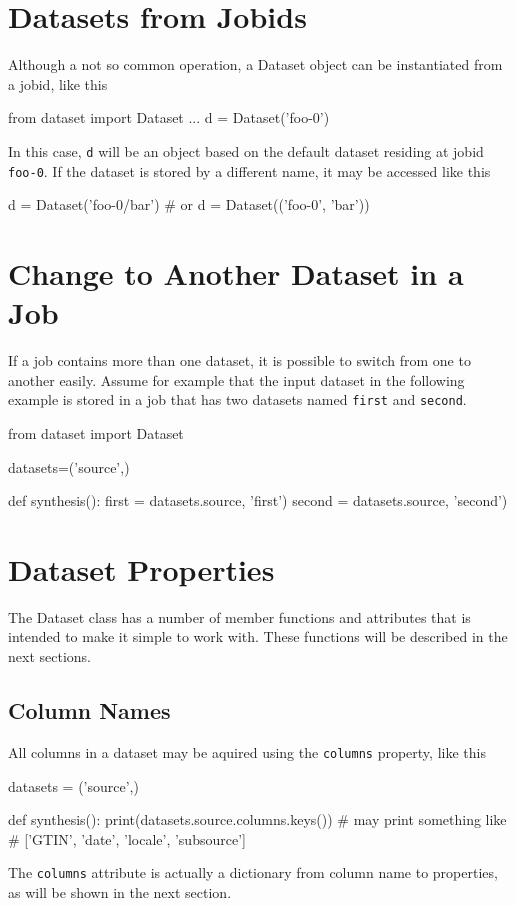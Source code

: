\section{Datasets from Jobids}
Although a not so common operation, a Dataset object can be
instantiated from a jobid, like this
\begin{python}
from dataset import Dataset
...
d = Dataset('foo-0')
\end{python}
In this case, \texttt{d} will be an object based on the default
dataset residing at jobid \texttt{foo-0}.  If the dataset is stored by
a different name, it may be accessed like this
\begin{python}
d = Dataset('foo-0/bar')
# or
d = Dataset(('foo-0', 'bar'))
\end{python}


\section{Change to Another Dataset in a Job}
If a job contains more than one dataset, it is possible to switch from
one to another easily.  Assume for example that the input dataset in
the following example is stored in a job that has two datasets
named \texttt{first} and \texttt{second}.
\begin{python}
from dataset import Dataset

datasets=('source',)

def synthesis():
    first = datasets.source, 'first')
    second = datasets.source, 'second')
\end{python}


                      



\clearpage
\section{Dataset Properties}
The Dataset class has a number of member functions and attributes that
is intended to make it simple to work with.  These functions will be
described in the next sections.


\subsection*{Column Names}
All columns in a dataset may be aquired using the \texttt{columns}
property, like this
\begin{python}
datasets = ('source',)

def synthesis():
  print(datasets.source.columns.keys())
  # may print something like
  # ['GTIN', 'date', 'locale', 'subsource']
\end{python}
The \texttt{columns} attribute is actually a dictionary from column
name to properties, as will be shown in the next section.


